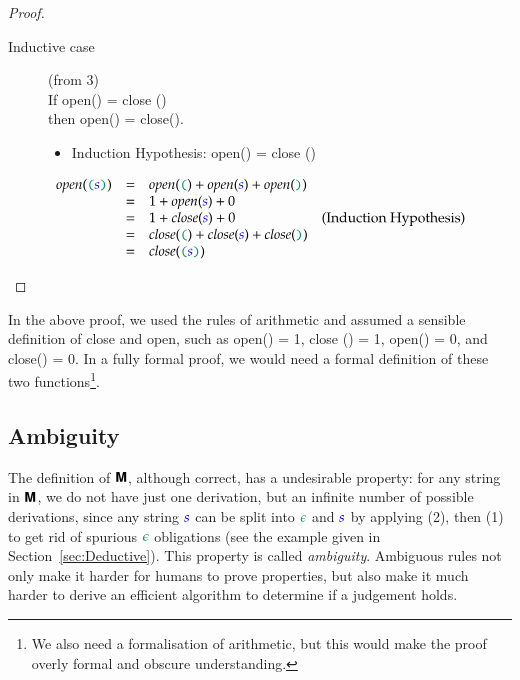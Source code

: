 \documentclass{book}
\begin{document}
\begin{theorem}
\begin{proof}
\begin{description}
\item[Inductive case] (from 3)\\
If \<open() = close ()\> \\
then \<open(\mconc{(}\mconc{)}) = close(\mconc{(}\mconc{)})\>.
  \begin{itemize}
  \item Induction Hypothesis:  \<open() = close ()\>
  \end{itemize}
    
  $\begin{array}{lclr}
	\mathit{open}(\mconc{(}\meta{s}\mconc{)}) &=& \mathit{open}(\mconc{(}) + \mathit{open}(\meta{s}) + \mathit{open}(\mconc{)}) \\
                                                  &=& 1  + \mathit{open}(\meta{s}) + 0  \\
                                                  &=& 1  + \mathit{close}(\meta{s}) + 0 & \text{(Induction Hypothesis)} \\
	                                          &=& \mathit{close}(\mconc{(}) + \mathit{close}(\meta{s}) + \mathit{close}(\mconc{)})\\
					          &=& \mathit{close}(\mconc{(}\meta{s}\mconc{)}) 
\end{array}$

\end{description}
\end{proof}
\end{theorem}
\noindent In the above proof, we used the rules of arithmetic and assumed a sensible
definition of \<close\> and \<open\>, such as \<open(\mconc{(}) = 1\>, \<close
(\mconc{)}) = 1\>, \<open(\mconc{)}) = 0\>, and \<close(\mconc{(}) = 0\>. In a fully
formal proof, we would need a formal definition of these two
functions\footnote{We also need a formalisation of arithmetic, but this would make the proof overly formal
  and obscure understanding.}.

\subsection{Ambiguity}
The definition of $\textsf{\textbf{M}}$, although correct, has a undesirable property: for
any string in $\textsf{\textbf{M}}$, we do not have just one derivation, but an
infinite number of possible derivations, since any string $\textcolor{blue}{s}$ can be split
into  $\conc{\epsilon}$ and $\textcolor{blue}{s}$ by applying (2), then (1) to get rid of
 spurious $\conc{\epsilon}$ obligations (see the example given in
 Section~\ref{sec:Deductive}). This property is called \emph{ambiguity}. Ambiguous rules
 not only make it harder for humans to prove properties, but also make it
 much harder to derive an efficient algorithm to determine if a judgement holds. 
\end{document}
